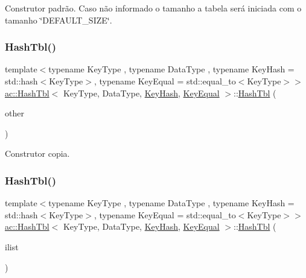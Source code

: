 Construtor padrão. Caso não informado o tamanho a tabela será iniciada com o tamanho \char`\"{}\+D\+E\+F\+A\+U\+L\+T\+\_\+\+S\+I\+Z\+E\char`\"{}. \mbox{\label{classac_1_1_hash_tbl_a01ae3d3c982c76c68d189515894773c5}} 
\subsubsection{\texorpdfstring{Hash\+Tbl()}{HashTbl()}\hspace{0.1cm}{\footnotesize\ttfamily [2/3]}}
{\footnotesize\ttfamily template$<$typename Key\+Type , typename Data\+Type , typename Key\+Hash  = std\+::hash$<$\+Key\+Type$>$, typename Key\+Equal  = std\+::equal\+\_\+to$<$\+Key\+Type$>$$>$ \\
\hyperlink{classac_1_1_hash_tbl}{ac\+::\+Hash\+Tbl}$<$ Key\+Type, Data\+Type, \hyperlink{struct_key_hash}{Key\+Hash}, \hyperlink{struct_key_equal}{Key\+Equal} $>$\+::\hyperlink{classac_1_1_hash_tbl}{Hash\+Tbl} (\begin{DoxyParamCaption}\item[{const \hyperlink{classac_1_1_hash_tbl}{Hash\+Tbl}$<$ Key\+Type, Data\+Type, \hyperlink{struct_key_hash}{Key\+Hash}, \hyperlink{struct_key_equal}{Key\+Equal} $>$ \&}]{other }\end{DoxyParamCaption})\hspace{0.3cm}{\ttfamily [inline]}}

Construtor copia. \mbox{\label{classac_1_1_hash_tbl_ab88aa3e7c646fe6310bea58097a72dc1}} 
\subsubsection{\texorpdfstring{Hash\+Tbl()}{HashTbl()}\hspace{0.1cm}{\footnotesize\ttfamily [3/3]}}
{\footnotesize\ttfamily template$<$typename Key\+Type , typename Data\+Type , typename Key\+Hash  = std\+::hash$<$\+Key\+Type$>$, typename Key\+Equal  = std\+::equal\+\_\+to$<$\+Key\+Type$>$$>$ \\
\hyperlink{classac_1_1_hash_tbl}{ac\+::\+Hash\+Tbl}$<$ Key\+Type, Data\+Type, \hyperlink{struct_key_hash}{Key\+Hash}, \hyperlink{struct_key_equal}{Key\+Equal} $>$\+::\hyperlink{classac_1_1_hash_tbl}{Hash\+Tbl} (\begin{DoxyParamCaption}\item[{std\+::initializer\+\_\+list$<$ \hyperlink{classac_1_1_hash_entry}{Entry} $>$}]{ilist }\end{DoxyParamCaption})\hspace{0.3cm}{\ttfamily [inline]}}

